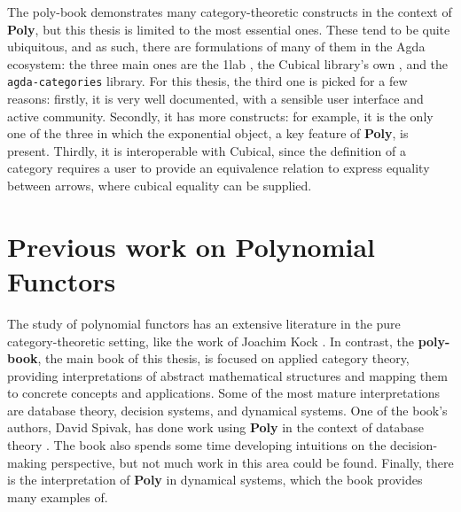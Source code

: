 The poly-book demonstrates many category-theoretic constructs in the context of \textbf{Poly}, but this thesis is limited to the most essential ones. These tend to be quite ubiquitous, and as such, there are formulations of many of them in the Agda ecosystem: the three main ones are the 1lab \cite{1lab}, the Cubical library's own \cite{cubical-cat}, and the \texttt{agda-categories} \cite{agda-cats} library. For this thesis, the third one is picked for a few reasons: firstly, it is very well documented, with a sensible user interface and active community. Secondly, it has more constructs: for example, it is the only one of the three in which the exponential object, a key feature of \textbf{Poly}, is present. Thirdly, it is interoperable with Cubical, since the definition of a category requires a user to provide an equivalence relation to express equality between arrows, where cubical equality can be supplied.

\section{Previous work on Polynomial Functors}

The study of polynomial functors has an extensive literature in the pure category-theoretic setting, like the work of Joachim Kock \cite{kockpoly} \cite{kock2009polynomial}. In contrast, the \textbf{poly-book}, the main book of this thesis, is focused on applied category theory, providing interpretations of abstract mathematical structures and mapping them to concrete concepts and applications. Some of the most mature interpretations are database theory, decision systems, and dynamical systems. One of the book's authors, David Spivak, has done work using \textbf{Poly} in the context of database theory \cite{spivak2023functorial}. The book also spends some time developing intuitions on the decision-making perspective, but not much work in this area could be found. Finally, there is the interpretation of \textbf{Poly} in dynamical systems, which the book provides many examples of.

